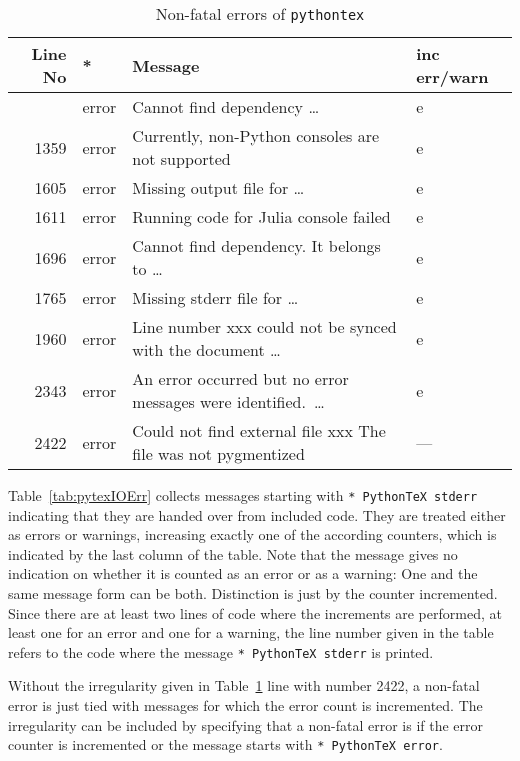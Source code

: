 \documentclass[a4paper, english]{article}%
\begin{document}
{\small
\begin{longtable}{|rlll|}
  \toprule
  Line No       & * & Message & inc err/warn  \\
  \midrule
  \midrule
  \endfirsthead%
  \bottomrule
  \caption{\label{tab:pytexNFErr} Non-fatal errors of \texttt{pythontex}  }
  \endlastfoot%
   655 & error  & Cannot find dependency \dots                                   & e   \\%
  1359 & error  & Currently, non-Python consoles are not supported               & e   \\%
  1605 & error  & Missing output file for \dots                                  & e   \\%
  1611 & error  & Running code for Julia console failed                          & e   \\%
  1696 & error  & Cannot find dependency. It belongs to \dots                    & e   \\%
  1765 & error  & Missing stderr file for \dots                                  & e   \\%
  1960 & error  & Line number xxx could not be synced with the document \dots    & e   \\%
  2343 & error  & An error occurred but no error messages were identified.~\dots & e   \\
  2422 & error  & Could not find external file xxx The file was not pygmentized  & --- \\ %
\end{longtable}
} %

Table~\ref{tab:pytexIOErr} collects messages starting with \texttt{* PythonTeX stderr} 
indicating that they are handed over from included code.  
They are treated either as errors or warnings, 
increasing exactly one of the according counters, 
which is indicated by the last column of the table. 
Note that the message gives no indication on whether it is counted as an error or as a warning: 
One and the same message form can be both. 
Distinction is just by the counter incremented. 
Since there are at least two lines of code where the increments are performed, 
at least one for an error and one for a warning, 
the line number given in the table refers to the code where the message 
\texttt{* PythonTeX stderr} is printed. 

Without the irregularity given in Table~\ref{tab:pytexNFErr} line with number 2422, 
a non-fatal error is just tied with messages for which the error count is incremented. 
The irregularity can be included by specifying 
that a non-fatal error is if the error counter is incremented 
or the message starts with \texttt{* PythonTeX error}. 
\end{document}

